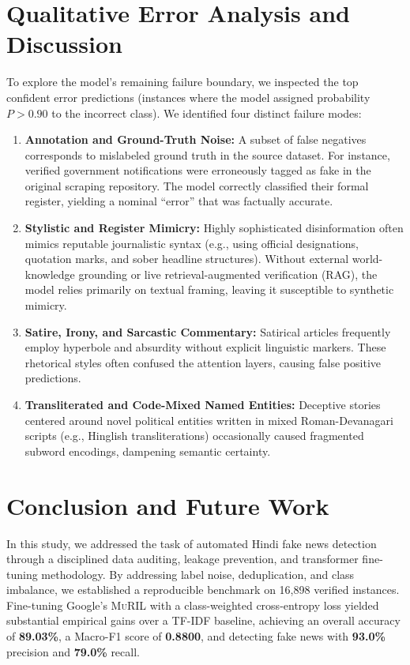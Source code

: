 \documentclass[11pt,a4paper]{article}
\begin{document}
\section{Qualitative Error Analysis and Discussion}
\label{sec:error_analysis}

To explore the model's remaining failure boundary, we inspected the top confident error predictions (instances where the model assigned probability $P > 0.90$ to the incorrect class). We identified four distinct failure modes:

\begin{enumerate}[leftmargin=*]
    \item \textbf{Annotation and Ground-Truth Noise:} A subset of false negatives corresponds to mislabeled ground truth in the source dataset. For instance, verified government notifications were erroneously tagged as fake in the original scraping repository. The model correctly classified their formal register, yielding a nominal ``error'' that was factually accurate.
    \item \textbf{Stylistic and Register Mimicry:} Highly sophisticated disinformation often mimics reputable journalistic syntax (e.g., using official designations, quotation marks, and sober headline structures). Without external world-knowledge grounding or live retrieval-augmented verification (RAG), the model relies primarily on textual framing, leaving it susceptible to synthetic mimicry.
    \item \textbf{Satire, Irony, and Sarcastic Commentary:} Satirical articles frequently employ hyperbole and absurdity without explicit linguistic markers. These rhetorical styles often confused the attention layers, causing false positive predictions.
    \item \textbf{Transliterated and Code-Mixed Named Entities:} Deceptive stories centered around novel political entities written in mixed Roman-Devanagari scripts (e.g., Hinglish transliterations) occasionally caused fragmented subword encodings, dampening semantic certainty.
\end{enumerate}

\section{Conclusion and Future Work}
\label{sec:conclusion}

In this study, we addressed the task of automated Hindi fake news detection through a disciplined data auditing, leakage prevention, and transformer fine-tuning methodology. By addressing label noise, deduplication, and class imbalance, we established a reproducible benchmark on 16,898 verified instances. Fine-tuning Google's \textsc{MuRIL} with a class-weighted cross-entropy loss yielded substantial empirical gains over a TF-IDF baseline, achieving an overall accuracy of \textbf{89.03\%}, a Macro-F1 score of \textbf{0.8800}, and detecting fake news with \textbf{93.0\%} precision and \textbf{79.0\%} recall.
\end{document}
